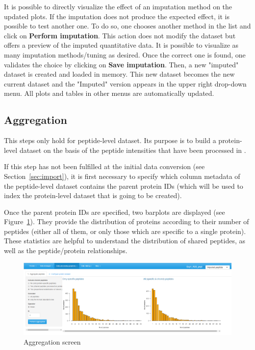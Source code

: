 \documentclass[12pt]{article}
\begin{document}
It is possible to directly visualize the effect of an imputation method on the updated plots. 
If the imputation does not produce the expected effect, 
it is possible to test another one. To do so, one chooses another 
method in the list and click on \textbf{Perform imputation}. 
This action does not modify the dataset but offers a 
preview of the imputed quantitative data.
It is possible to visualize as many imputation methods/tuning as desired. 
Once the correct one is found, one validates the choice by clicking on 
\textbf{Save imputation}. Then, a new "imputed" dataset is created and loaded in 
memory. This new dataset becomes the new current dataset and the "Imputed" version
appears in the upper right drop-down menu. All plots and 
tables in other menus are automatically updated.

\subsection{Aggregation}\label{aggregation}

This steps only hold for peptide-level dataset. Its purpose is to build a 
protein-level dataset on the basis of the peptide intensities that have been
processed in .

If this step has not been fulfilled at the initial data conversion (see Section~\ref{sec:import}),
it is first necessary to specify which column metadata of the peptide-level dataset
contains the parent protein IDs (which will be used to index the protein-level
dataset that is going to be created).

 
Once the parent protein IDs are specified, two barplots are displayed 
(see Figure~\ref{fig:aggregation}). They provide the distribution 
of proteins according to their number of peptides (either all of them, or 
only those which are specific to a single protein). These statistics are 
helpful to understand the distribution of shared peptides, as well as the
peptide/protein relationships.

\begin {figure}
\includegraphics[width=\textwidth]{images/aggregation.png}
\caption{Aggregation screen}\label{fig:aggregation}
\end {figure}
\end{document}
